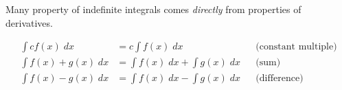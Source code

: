 \documentclass[../main.tex]{subfiles}
\begin{document}


\clearpage
Many property of indefinite integrals comes \emph{directly} from properties of derivatives.

\begin{mdframed}[style=withref-compact]
  \begin{align*}
    \int c f(x) \;dx 
    &= c \int f(x) \;dx && \text{(constant multiple)}\\
    \int f(x) + g(x) \;dx 
    &= \int f(x) \;dx + \int g(x) \;dx && \text{(sum)}\\
    \int f(x) - g(x) \;dx 
    &= \int f(x) \;dx - \int g(x) \;dx && \text{(difference)}
  \end{align*}

\end{mdframed}
\end{document}
